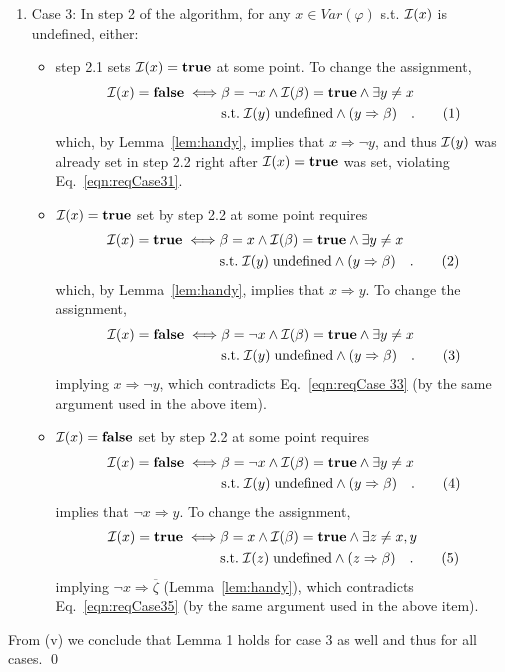 \documentclass [11pt]{article}
\newcommand{\Ra}{\Rightarrow}
\renewcommand{\phi}{\varphi}
\def\II{{\cal I}}
\newcommand{\True}{\mathbf{true}}
\newcommand{\False}{\mathbf{false}}
\def\ox{\neg x}
\def\oy{\neg y}
\def\oz{\neg z}
\def\oz{\overline{\zeta}}
\def\b{\beta}
\newcommand\numberthis{\addtocounter{equation}{1}\tag{\theequation}}
\newcommand\neqn[1]{\numberthis\label{eqn:#1}}
\begin{document}
\begin{enumerate}[label=(\roman*), resume]
\item Case 3: In step 2 of the algorithm, for any $x \in Var(\phi)$ s.t. $\II(x)$ is undefined, either:
\begin{itemize}
\item step 2.1 sets $\II(x) = \True$ at some point. To change the assignment,
\begin{align}
\II(x) = \False \iff &\b = \ox \land \II(\b) = \True \land \exists y\neq x\; \\
& \mathrm{s.t.}\; \II(y)\; \mathrm{undefined} \land (y \Ra \b)\quad . \neqn{reqCase31}
\end{align}
which, by Lemma~\ref{lem:handy}, implies that $x \Ra \oy$, and thus $\II(y)$ was already set in step 2.2 right after  $\II(x) = \True$ was set, violating Eq.~\ref{eqn:reqCase31}. 
\item $\II(x) = \True$ set by step 2.2 at some point requires 
\begin{align}
\II(x) = \True \iff &\b = x \land \II(\b) = \True \land \exists y\neq x\; \\
& \mathrm{s.t.}\; \II(y)\; \mathrm{undefined} \land (y \Ra \b)\quad . \neqn{reqCase32}
\end{align}
which, by Lemma~\ref{lem:handy}, implies that $x \Ra y$. To change the assignment,
\begin{align}
\II(x) = \False \iff &\b = \ox \land \II(\b) = \True \land \exists y\neq x\; \\
& \mathrm{s.t.}\; \II(y)\; \mathrm{undefined} \land (y \Ra \b)\quad . \neqn{reqCase33}
\end{align}
implying $x \Ra \oy$, which contradicts Eq.~\ref{eqn:reqCase 33} (by the same argument used in the above item).
\item $\II(x) = \False$ set by step 2.2 at some point requires 
\begin{align}
\II(x) = \False \iff &\b = \ox \land \II(\b) = \True \land \exists y\neq x\; \\
& \mathrm{s.t.}\; \II(y)\; \mathrm{undefined} \land (y \Ra \b)\quad . \neqn{reqCase34}
\end{align}
implies that $\ox \Ra y$. To change the assignment,
\begin{align}
\II(x) = \True \iff &\b = x \land \II(\b) = \True \land \exists z\neq x,y\; \\
& \mathrm{s.t.}\; \II(z)\; \mathrm{undefined} \land (z \Ra \b)\quad . \neqn{reqCase35}
\end{align}
implying $\ox \Ra \oz$ (Lemma~\ref{lem:handy}), which contradicts Eq.~\ref{eqn:reqCase35} (by the same argument used in the above item).
\end{itemize}
\end{enumerate}
From (v) we conclude that Lemma 1 holds for case 3 as well and thus for all cases.
\qed
\end{document}
